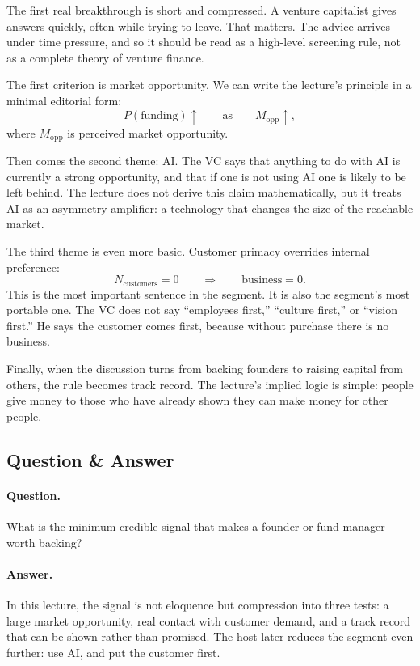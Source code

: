 The first real breakthrough is short and compressed. A venture capitalist gives answers quickly, often while trying to leave. That matters. The advice arrives under time pressure, and so it should be read as a high-level screening rule, not as a complete theory of venture finance.

The first criterion is market opportunity. We can write the lecture's principle in a minimal editorial form:
\begin{equation}
P(\text{funding}) \uparrow
\qquad \text{as} \qquad
M_{\text{opp}} \uparrow,
\end{equation}
where \(M_{\text{opp}}\) is perceived market opportunity.

Then comes the second theme: AI. The VC says that anything to do with AI is currently a strong opportunity, and that if one is not using AI one is likely to be left behind. The lecture does not derive this claim mathematically, but it treats AI as an asymmetry-amplifier: a technology that changes the size of the reachable market.

The third theme is even more basic. Customer primacy overrides internal preference:
\begin{equation}
N_{\text{customers}} = 0
\qquad \Longrightarrow \qquad
\text{business} = 0.
\end{equation}
This is the most important sentence in the segment. It is also the segment's most portable one. The VC does not say ``employees first,'' ``culture first,'' or ``vision first.'' He says the customer comes first, because without purchase there is no business.

Finally, when the discussion turns from backing founders to raising capital from others, the rule becomes track record. The lecture's implied logic is simple: people give money to those who have already shown they can make money for other people.

\subsection{Question \& Answer}

\paragraph{Question.} What is the minimum credible signal that makes a founder or fund manager worth backing?

\paragraph{Answer.} In this lecture, the signal is not eloquence but compression into three tests: a large market opportunity, real contact with customer demand, and a track record that can be shown rather than promised. The host later reduces the segment even further: use AI, and put the customer first.

